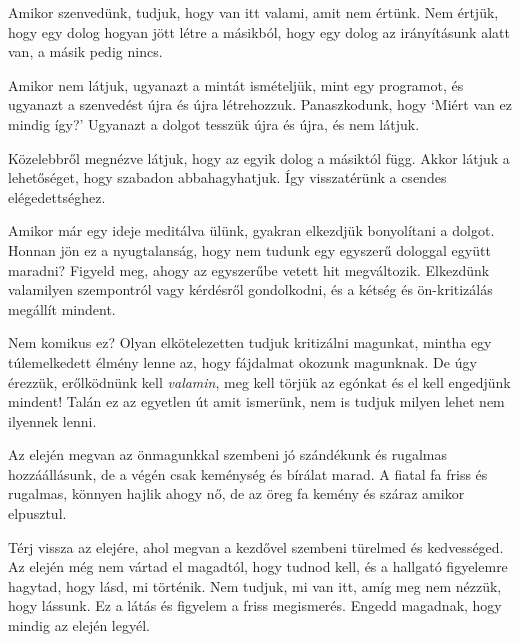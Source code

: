
Amikor szenvedünk, tudjuk, hogy van itt valami, amit nem értünk. Nem
értjük, hogy egy dolog hogyan jött létre a másikból, hogy egy dolog az
irányításunk alatt van, a másik pedig nincs.

Amikor nem látjuk, ugyanazt a mintát ismételjük, mint egy programot, és
ugyanazt a szenvedést újra és újra létrehozzuk. Panaszkodunk, hogy
`Miért van ez mindig így?' Ugyanazt a dolgot tesszük újra és újra, és
nem látjuk.

Közelebbről megnézve látjuk, hogy az egyik dolog a másiktól függ. Akkor
látjuk a lehetőséget, hogy szabadon abbahagyhatjuk. Így visszatérünk a
csendes elégedettséghez.


Amikor már egy ideje meditálva ülünk, gyakran elkezdjük bonyolítani a
dolgot. Honnan jön ez a nyugtalanság, hogy nem tudunk egy egyszerű
dologgal együtt maradni? Figyeld meg, ahogy az egyszerűbe vetett hit
megváltozik. Elkezdünk valamilyen szempontról vagy kérdésről
gondolkodni, és a kétség és ön-kritizálás megállít mindent.

Nem komikus ez? Olyan elkötelezetten tudjuk kritizálni magunkat, mintha
egy túlemelkedett élmény lenne az, hogy fájdalmat okozunk magunknak. De
úgy érezzük, erőlködnünk kell \emph{valamin}, meg kell törjük az egónkat
és el kell engedjünk mindent! Talán ez az egyetlen út amit ismerünk, nem
is tudjuk milyen lehet nem ilyennek lenni.

Az elején megvan az önmagunkkal szembeni jó szándékunk és rugalmas
hozzáállásunk, de a végén csak keménység és bírálat marad. A fiatal fa
friss és rugalmas, könnyen hajlik ahogy nő, de az öreg fa kemény és
száraz amikor elpusztul.

Térj vissza az elejére, ahol megvan a kezdővel szembeni türelmed és
kedvességed. Az elején még nem vártad el magadtól, hogy tudnod kell, és
a hallgató figyelemre hagytad, hogy lásd, mi történik. Nem tudjuk, mi
van itt, amíg meg nem nézzük, hogy lássunk. Ez a látás és figyelem a
friss megismerés. Engedd magadnak, hogy mindig az elején legyél.
